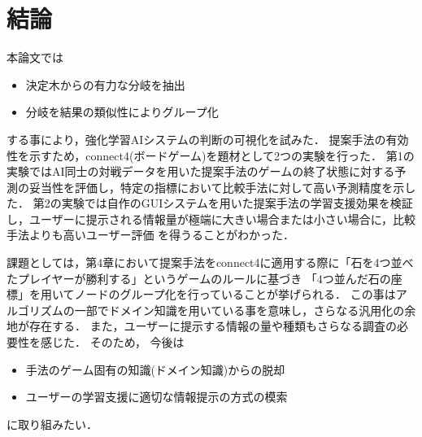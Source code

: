 \chapter{結論}

本論文では
\begin{itemize}
	\item 決定木からの有力な分岐を抽出
	\item 分岐を結果の類似性によりグループ化
\end{itemize}

する事により，強化学習AIシステムの判断の可視化を試みた．
提案手法の有効性を示すため，connect4(ボードゲーム)を題材として2つの実験を行った．
第1の実験ではAI同士の対戦データを用いた提案手法のゲームの終了状態に対する予測の妥当性を評価し，特定の指標において比較手法に対して高い予測精度を示した．
第2の実験では自作のGUIシステムを用いた提案手法の学習支援効果を検証し，ユーザーに提示される情報量が極端に大きい場合または小さい場合に，比較手法よりも高いユーザー評価
を得うることがわかった．

課題としては，第4章において提案手法をconnect4に適用する際に「石を4つ並べたプレイヤーが勝利する」というゲームのルールに基づき
「4つ並んだ石の座標」を用いてノードのグループ化を行っていることが挙げられる．
この事はアルゴリズムの一部でドメイン知識を用いている事を意味し，さらなる汎用化の余地が存在する．
また，ユーザーに提示する情報の量や種類もさらなる調査の必要性を感じた．
そのため，
今後は
\begin{itemize}
	\item 手法のゲーム固有の知識(ドメイン知識)からの脱却
	\item ユーザーの学習支援に適切な情報提示の方式の模索
\end{itemize}


に取り組みたい．
